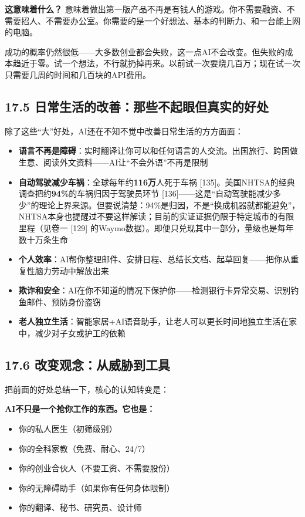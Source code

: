 \documentclass[11pt,a4paper]{ctexart}
\begin{document}
\textbf{这意味着什么？} 意味着做出第一版产品不再是有钱人的游戏。你不需要融资、不需要招人、不需要办公室。你需要的是一个好想法、基本的判断力、和一台能上网的电脑。

成功的概率仍然很低——大多数创业都会失败，这一点AI不会改变。但失败的成本趋近于零。试一个想法，不行就扔掉再来。以前试一次要烧几百万；现在试一次只需要几周的时间和几百块的API费用。

\subsection{17.5 日常生活的改善：那些不起眼但真实的好处}

除了这些“大”好处，AI还在不知不觉中改善日常生活的方方面面：

\begin{itemize}
  \item \textbf{语言不再是障碍}：实时翻译让你可以和任何语言的人交流。出国旅行、跨国做生意、阅读外文资料——AI让“不会外语”不再是限制
  \item \textbf{自动驾驶减少车祸}：全球每年约\textbf{116万}人死于车祸 [135]。美国NHTSA的经典调查把约\textbf{94\%}的车祸归因于驾驶员环节 [136]——这是“自动驾驶能减少多少”的理论上界来源。但要说清楚：94\%是归因，不是“换成机器就都能避免”，NHTSA本身也提醒过不要这样解读；目前的实证证据仍限于特定城市的有限里程（见卷一 [129] 的Waymo数据）。即便只兑现其中一部分，量级也是每年数十万条生命
  \item \textbf{个人效率}：AI帮你整理邮件、安排日程、总结长文档、起草回复——把你从重复性脑力劳动中解放出来
  \item \textbf{欺诈和安全}：AI在你不知道的情况下保护你——检测银行卡异常交易、识别钓鱼邮件、预防身份盗窃
  \item \textbf{老人独立生活}：智能家居+AI语音助手，让老人可以更长时间地独立生活在家中，减少对子女或护工的依赖
\end{itemize}

\subsection{17.6 改变观念：从威胁到工具}

把前面的好处总结一下，核心的认知转变是：

\textbf{AI不只是一个抢你工作的东西。它也是：}

\begin{itemize}
  \item 你的私人医生（初筛级别）
  \item 你的全科家教（免费、耐心、24/7）
  \item 你的创业合伙人（不要工资、不需要股份）
  \item 你的无障碍助手（如果你有任何身体限制）
  \item 你的翻译、秘书、研究员、设计师
\end{itemize}
\end{document}
